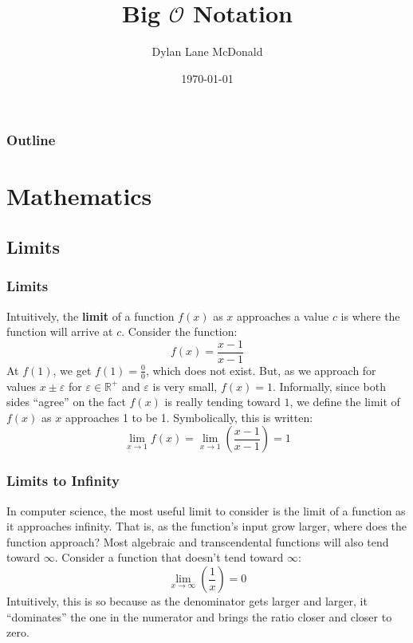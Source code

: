 \documentclass[aspectratio=169]{beamer}
\title{Big $\mathcal{O}$ Notation}
\author{Dylan Lane McDonald}
\institute{CNM STEMulus Center\\Web Development with PHP}
\date{\today}
\begin{document}
\lstset{language=Java}
\begin{frame}
\titlepage
\end{frame}

\begin{frame}
\frametitle{Outline}
\tableofcontents
\end{frame}

\section{Mathematics}
\subsection{Limits}
\begin{frame}
\frametitle{Limits}
Intuitively, the \textbf{limit} of a function $f(x)$ as $x$ approaches a value $c$ is where the function will arrive at $c$. Consider the function:
\begin{equation}
f(x) = \frac {x - 1}{x - 1}
\label{eqn:ratio}
\end{equation}
At $f(1)$, we get $f(1) = \frac 00$, which does not exist. But, as we approach for values $x \pm \varepsilon$ for $\varepsilon \in \mathbb{R}^+$ and $\varepsilon$ is very small, $f(x) = 1$. Informally, since both sides ``agree'' on the fact $f(x)$ is really tending toward $1$, we define the limit of $f(x)$ as $x$ approaches 1 to be 1. Symbolically, this is written:
\[
\lim_{x \rightarrow 1} f(x) = \lim_{x \rightarrow 1} \left(\frac {x - 1}{x - 1}\right) = 1
\]
\end{frame}

\begin{frame}
\frametitle{Limits to Infinity}
In computer science, the most useful limit to consider is the limit of a function as it approaches infinity. That is, as the function's input grow larger, where does the function approach? Most algebraic and transcendental functions will also tend toward $\infty$. Consider a function that doesn't tend toward $\infty$:
\[
\lim_{x \rightarrow \infty} \left(\frac 1x\right) = 0
\]
Intuitively, this is so because as the denominator gets larger and larger, it ``dominates'' the one in the numerator and brings the ratio closer and closer to zero.
\end{frame}
\end{document}
